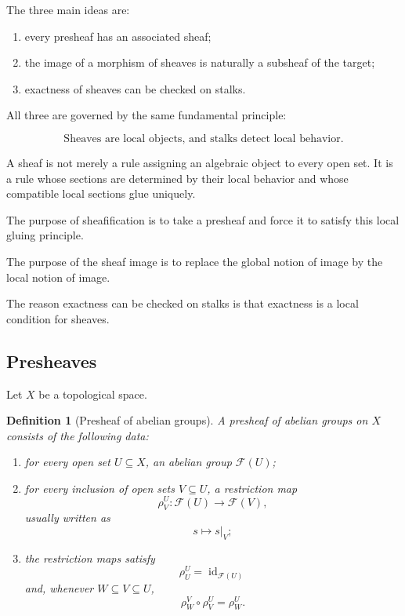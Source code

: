 \documentclass[12pt,a4paper]{article}
\newtheorem{definition}{Definition}[section]
\newcommand{\id}{\operatorname{id}}
\begin{document}
The three main ideas are:

\begin{enumerate}
	\item every presheaf has an associated sheaf;
	\item the image of a morphism of sheaves is naturally a subsheaf of the target;
	\item exactness of sheaves can be checked on stalks.
\end{enumerate}

All three are governed by the same fundamental principle:

\[
\boxed{
	\text{Sheaves are local objects, and stalks detect local behavior.}
}
\]

A sheaf is not merely a rule assigning an algebraic object to every open set.
It is a rule whose sections are determined by their local behavior and whose
compatible local sections glue uniquely.

The purpose of sheafification is to take a presheaf and force it to satisfy
this local gluing principle.

The purpose of the sheaf image is to replace the global notion of image by the
local notion of image.

The reason exactness can be checked on stalks is that exactness is a local
condition for sheaves.

\subsection{Presheaves}

Let $X$ be a topological space.

\begin{definition}[Presheaf of abelian groups]
	A presheaf of abelian groups on $X$ consists of the following data:
	
	\begin{enumerate}
		\item for every open set $U \subseteq X$, an abelian group $\mathcal F(U)$;
		\item for every inclusion of open sets $V \subseteq U$, a restriction map
		\[
		\rho^U_V : \mathcal F(U) \longrightarrow \mathcal F(V),
		\]
		usually written as
		\[
		s \longmapsto s|_V;
		\]
		\item the restriction maps satisfy
		\[
		\rho^U_U = \id_{\mathcal F(U)}
		\]
		and, whenever $W \subseteq V \subseteq U$,
		\[
		\rho^V_W \circ \rho^U_V = \rho^U_W.
		\]
	\end{enumerate}
\end{definition}
\end{document}
